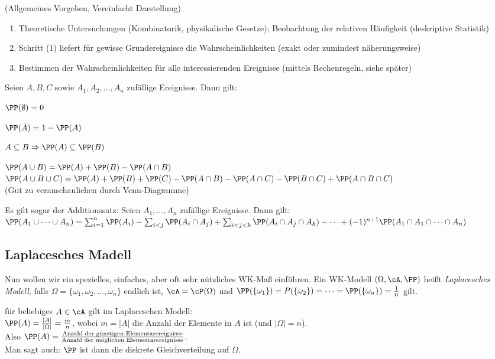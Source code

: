 (Allgemeines Vorgehen, Vereinfacht Darstellung)
\begin{enumerate}
\item Theoretische Untersuchungen (Kombinatorik, physikalische Gesetze); Beobachtung der relativen Häufigkeit (deskriptive Statistik)
\item Schritt (1) liefert für gewisse Grundereignisse die Wahrscheinlichkeiten (exakt oder zumindest näherungsweise)
\item Bestimmen der Wahrscheinlichkeiten für alle interessierenden Ereignisse (mittels Rechenregeln, siehe später)
\end{enumerate}

 Seien $A,B,C$ sowie $A_1, A_2, \dots ,A_n$ zufällige Ereignisse. Dann gilt:
\begin{anumerate}
\item $\PP(\emptyset)=0$
\item $\PP(\bar A) = 1 - \PP (A)$
\item $A \subseteq B \Rightarrow \PP(A) \subseteq \PP (B)$
\item $\PP(A \cup B)=\PP(A)+\PP(B)-\PP(A \cap B)$\\
$\PP ( A \cup B \cup C) = \PP(A) + \PP(B) + \PP(C)-\PP(A \cap B) - \PP(A\cap C) - \PP(B\cap C ) + \PP(A \cap B \cap C)$\\
(Gut zu veranschaulichen durch Venn-Diagramme)
\end{anumerate}
Es gilt sogar der Additionssatz:
 Seien $A_1, \dots, A_n$ zufällige Ereignisse. Dann gilt: \\
$\PP(A_1 \cup \dots \cup A_n)=\sum_{i=1}^n \PP(A_i)-\sum_{i<j} \PP(A_i \cap A_j) + \sum_{i<j<k}\PP(A_i \cap A_j \cap A_k) - \dots + (-1)^{n+1} \PP(A_1\cap A_1 \cap \dots \cap A_n)$

\subsection{Laplacesches Madell}
Nun wollen wir ein spezielles, einfaches, aber oft sehr nützliches WK-Maß einführen.
 Ein WK-Modell $(\Omega, \cA, \PP)$ heißt \emph{Laplacesches Modell}, falls $\Omega = \{\omega_1, \omega_2, \dots , \omega_n\}$ endlich ist, $\cA = \cP ( \Omega)$ und $\PP(\{\omega_1\})=P(\{\omega_2\})=\dots = \PP(\{\omega_n\})=\frac{1}{n}$ gilt.

 für beliebiges $A \in \cA$ gilt im Laplaceschen Modell:\\
$\PP(A) = \frac{|A|}{|\Omega|}=\frac{m}{n}$, wobei $m=|A|$ die Anzahl der Elemente in $A$ ist (und $|\Omega|=n$).\\
Also $\PP(A)=\frac{\text{Anzahl der günstigen Elementarereignisse}}{\text{Anzahl der möglichen Elementarereignisse}}$.\\
Man sagt auch: $\PP$ ist dann die diskrete Gleichverteilung auf $\Omega$.

